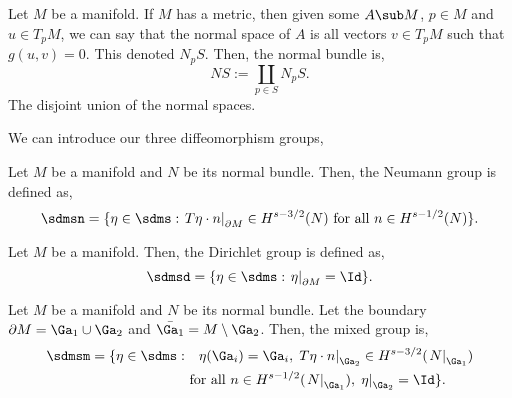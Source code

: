 \begin{ndefi}
  Let $M$ be a manifold. If $M$ has a metric, then given some $A \sub M$, $p \in M$ and $u \in T_pM$, we can say that the normal space of $A$ is all vectors $v \in T_pM$ such that $g(u,v) = 0$. This denoted $N_pS$. Then, the normal bundle is,
  $$ NS := \coprod_{p \in S} N_pS. $$
  The disjoint union of the normal spaces.
\end{ndefi}
\noindent
We can introduce our three diffeomorphism groups,
\begin{ndefi}
  Let $M$ be a manifold and $N$ be its normal bundle. Then, the Neumann group is defined as,
  $$ \sdmsn = \{ \eta \in \sdms : \left.T\eta \cdot n\right|_{\partial M} \in H^{s - 3/2}(N) \text{ for all } n \in H^{s - 1/2}(N) \}. $$
\end{ndefi}
\begin{ndefi}
  Let $M$ be a manifold. Then, the Dirichlet group is defined as,
  $$ \sdmsd = \{ \eta \in \sdms : \left. \eta \right|_{\partial M} = \Id \}. $$
\end{ndefi}
\begin{ndefi}
  Let $M$ be a manifold and $N$ be its normal bundle. Let the boundary $\partial M = \Ga_1 \cup \Ga_2$ and $\bar{\Ga_1} = M \setminus \Ga_2$. Then, the mixed group is,
  \begin{align*}
    \sdmsm = \{ \eta \in \sdms : &\quad\eta (\Ga_i) = \Ga_i,\, \left.T\eta \cdot n\right|_{\Ga_2} \in H^{s - 3/2}(\left. N \right|_{\Ga_1}) \\
    &\text{ for all } n \in H^{s - 1/2}(\left. N \right|_{\Ga_1}),\, \left. \eta \right|_{\Ga_2} = \Id \}.
  \end{align*}
\end{ndefi}

